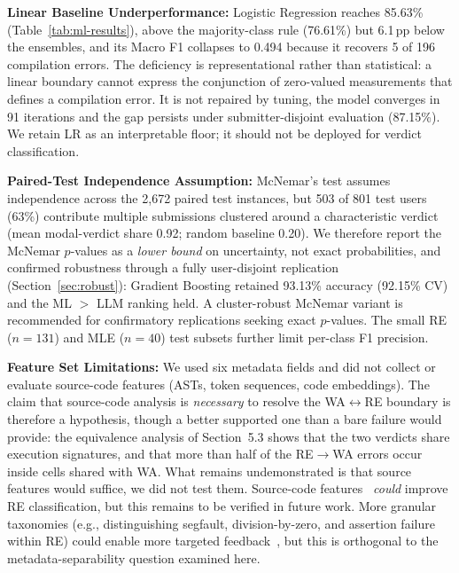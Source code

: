 \documentclass[acmsmall]{acmart}
\begin{document}
\textbf{Linear Baseline Underperformance:} Logistic Regression reaches 85.63\%
(Table~\ref{tab:ml-results}), above the majority-class rule (76.61\%) but 6.1\,pp
below the ensembles, and its Macro F1 collapses to 0.494 because it recovers 5
of 196 compilation errors. The deficiency is representational rather than
statistical: a linear boundary cannot express the conjunction of zero-valued
measurements that defines a compilation error. It is not repaired by tuning, the
model converges in 91 iterations and the gap persists under submitter-disjoint
evaluation (87.15\%). We retain LR as an interpretable floor; it should not be
deployed for verdict classification.



\textbf{Paired-Test Independence Assumption:} McNemar's test assumes independence
across the 2,672 paired test instances, but 503 of 801 test users (63\%) contribute
multiple submissions clustered around a characteristic verdict (mean modal-verdict
share 0.92; random baseline 0.20). We therefore report the McNemar $p$-values as a
\emph{lower bound} on uncertainty, not exact probabilities, and confirmed robustness
through a fully user-disjoint replication (Section~\ref{sec:robust}): Gradient
Boosting retained 93.13\% accuracy (92.15\% CV) and the ML $>$ LLM ranking held. A cluster-robust
McNemar variant is recommended for confirmatory replications seeking exact $p$-values.
The small RE ($n=131$) and MLE ($n=40$) test subsets further limit per-class F1 precision.

\textbf{Feature Set Limitations:} We used six metadata fields and did not
collect or evaluate source-code features (ASTs, token sequences, code embeddings).
The claim that source-code analysis is \emph{necessary} to resolve the
WA$\leftrightarrow$RE boundary is therefore a hypothesis, though a better
supported one than a bare failure would provide: the equivalence analysis of
Section~5.3 shows that the two verdicts share execution signatures, and that
more than half of the RE$\rightarrow$WA errors occur inside cells shared with
WA. What remains undemonstrated is that source features would suffice, we did
not test them. Source-code features~\cite{allamanis2018learning}
\emph{could} improve RE classification, but this remains to be verified in future work. More granular taxonomies (e.g., distinguishing segfault, division-by-zero, and assertion failure within RE) could enable more targeted feedback~\cite{altadmri2015most}, but this is orthogonal to the metadata-separability question examined here.
\end{document}
